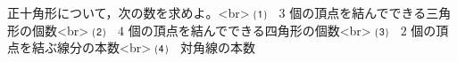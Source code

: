 正十角形について，次の数を求めよ。<br>
⑴　$3$ 個の頂点を結んでできる三角形の個数<br>
⑵　$4$ 個の頂点を結んでできる四角形の個数<br>
⑶　$2$ 個の頂点を結ぶ線分の本数<br>
⑷　対角線の本数
